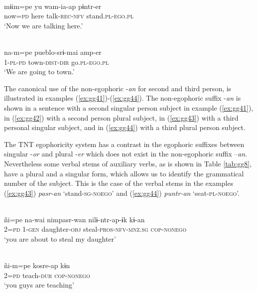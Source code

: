 \documentclass[output=paper]{langsci/langscibook}
\begin{document}

\ea \label{ex:gg38}
\\
    \gll mɨim=pe	yu	wam-ia-ap	pɨntr-er\\
         now=\textsc{pd}	here	talk-\textsc{rec-nfv}	stand.\textsc{pl-ego.pl}\\
    \glt ‘Now we are talking here.'
\z

\ea \label{ex:gg39}
\\
    \gll na-m=pe	pueblo-srɨ-mai	amp-er\\
         1-\textsc{pl-pd}	town-\textsc{dist-dir}	go.\textsc{pl-ego.pl}\\
    \glt ‘We are going to town.'
\z

The canonical use of the non-egophoric -\textit{an} for second and third person, is illustrated in examples (\ref{ex:gg41})-(\ref{ex:gg44}). The non-egophoric suffix -\textit{an} is shown in a sentence with a second singular person subject in example (\ref{ex:gg41}), in (\ref{ex:gg42}) with a second person plural subject, in (\ref{ex:gg43}) with a third personal singular subject, and in (\ref{ex:gg44}) with a third plural person subject. 

The TNT egophoricity system has a contrast in the egophoric suffixes between singular -\textit{or} and plural -\textit{er} which does not exist in the non-egophoric suffix –\textit{an}. Nevertheless some verbal stems of auxiliary verbs, as is shown in Table \ref{tab:gg8}, have a plural and a singular form, which allows us to identify the grammatical number of the subject. This is the case of the verbal stems in the examples (\ref{ex:gg43}) \textit{pasr-an} ‘stand-\textsc{sg-noego}’ and (\ref{ex:gg44}) \textit{puntr-an} ‘seat-\textsc{pl-noego}’.


\ea \label{ex:gg41}
\\
    \gll ñi=pe	na-wai	nimpasr-wan	nilɨ-ntr-ap-ɨk	kɨ-an\\
         2=\textsc{pd}	1-\textsc{gen}	daughter-\textsc{obj}	steal-\textsc{pros-nfv-mnz.sg}	\textsc{cop-nonego}\\
    \glt ‘you are about to steal my daughter'
\z


\ea \label{ex:gg42}
\\
    \gll ñi-m=pe	kosre-ap kɨn\\
         2=\textsc{pd}	teach-\textsc{dur} \textsc{cop-nonego}\\
    \glt ‘you guys are teaching'
\z
\end{document}
